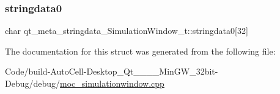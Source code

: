 \subsubsection{\texorpdfstring{stringdata0}{stringdata0}}
{\footnotesize\ttfamily char qt\+\_\+meta\+\_\+stringdata\+\_\+\+Simulation\+Window\+\_\+t\+::stringdata0\mbox{[}32\mbox{]}}



The documentation for this struct was generated from the following file\+:\begin{DoxyCompactItemize}
\item 
Code/build-\/\+Auto\+Cell-\/\+Desktop\+\_\+\+Qt\+\_\+\_\+\_\+\_\+\+Min\+G\+W\+\_\+32bit-\/\+Debug/debug/\mbox{\hyperlink{moc__simulationwindow_8cpp}{moc\+\_\+simulationwindow.\+cpp}}\end{DoxyCompactItemize}
